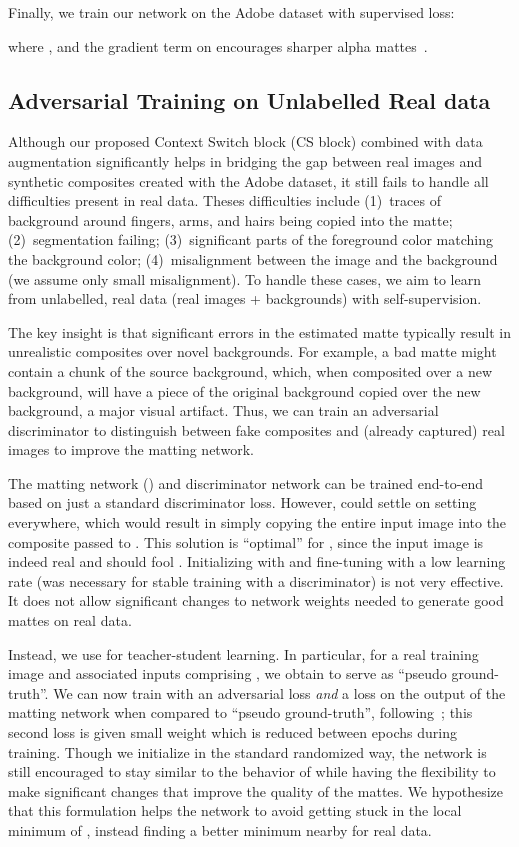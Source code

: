 \documentclass[10pt,twocolumn,letterpaper]{article}
\begin{document}
Finally, we train our network  on the Adobe dataset with supervised loss:
\vspace{-2mm}

where , and the gradient term on  encourages sharper alpha mattes~\cite{zhang2019late}. 



\subsection{Adversarial Training on Unlabelled Real data}
\label{sec:self_sup_train}
Although our proposed Context Switch block (CS block) combined with  data augmentation significantly helps in bridging the gap between real images and synthetic composites created with the Adobe dataset, it still fails to handle all difficulties present in real data. Theses difficulties include (1)~traces of background around fingers, arms, and hairs being copied into the matte; (2)~segmentation failing; (3)~significant parts of the foreground color matching the background color; (4)~misalignment between the image and the background (we assume only small misalignment). To handle these cases, we aim to learn from unlabelled, real data (real images + backgrounds) with self-supervision.

The key insight is that significant errors in the estimated matte typically result in unrealistic composites over novel backgrounds.  For example, a bad matte might contain a chunk of the source background, which, when composited over a new background, will have a piece of the original background copied over the new background, a major visual artifact.  Thus, we can train an adversarial discriminator to distinguish between fake composites and (already captured) real images to improve the matting network.

The matting network () and discriminator  network  can be trained end-to-end based on just a standard discriminator loss.  However,  could settle on setting  everywhere, which would result in simply copying the entire input image into the composite passed to .  This solution is ``optimal'' for , since the input image is indeed real and should fool .  Initializing with  and fine-tuning with a low learning rate (was necessary for stable training with a discriminator) is not very effective. It does not allow significant changes to network weights needed to generate good mattes on real data.

Instead, we use  for teacher-student learning. In particular, for a real training image  and associated inputs comprising , we obtain  to serve as ``pseudo ground-truth''. We can now train with an adversarial loss {\it and} a loss on the output of the matting network  when compared to ``pseudo ground-truth'', following~\cite{sfsnetSengupta18}; this second loss is given small weight which is reduced between epochs during training.  Though we initialize  in the standard randomized way, the network is still encouraged to stay similar to the behavior of  while having the flexibility to make significant changes that improve the quality of the mattes. We hypothesize that this formulation helps the network to avoid getting stuck in the local minimum of , instead finding a better minimum nearby for real data. 
\end{document}

